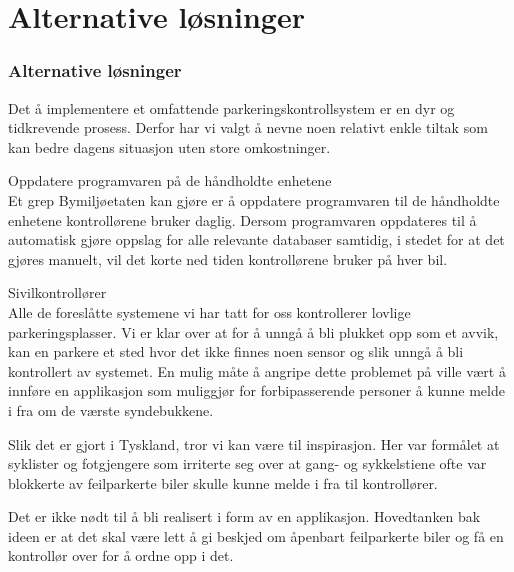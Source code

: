 \documentclass[xetex]{beamer}
\begin{document}
\begin{frame}\label{fr:alternative_losninger}
	\section{Alternative løsninger}
	\frametitle{Alternative løsninger}
	
	Det å implementere et omfattende parkeringskontrollsystem er en \alert{dyr og tidkrevende} prosess. Derfor har vi valgt å nevne noen relativt enkle tiltak som kan bedre dagens situasjon uten store omkostninger.
	
	{\footnotesize\alert{Oppdatere programvaren på de håndholdte enhetene}}\\
	Et grep Bymiljøetaten kan gjøre er å \alert{oppdatere programvaren til de håndholdte enhetene} kontrollørene bruker daglig. Dersom programvaren oppdateres til å \alert{automatisk} gjøre oppslag for alle relevante databaser samtidig, i stedet for at det gjøres manuelt, vil det korte ned tiden kontrollørene bruker på hver bil.
	
	{\footnotesize\alert{Sivilkontrollører}}\\
	Alle de foreslåtte systemene vi har tatt for oss kontrollerer lovlige parkeringsplasser. Vi er klar over at for å unngå å bli plukket opp som et avvik, kan en parkere et sted hvor det ikke finnes noen sensor og slik unngå å bli kontrollert av systemet. En mulig måte å angripe dette problemet på ville vært å innføre en applikasjon som muliggjør for forbipasserende personer å kunne melde i fra om de værste syndebukkene. 

	Slik det er gjort i \alert{Tyskland}, tror vi kan være til inspirasjon. Her var formålet at syklister og fotgjengere som irriterte seg over at gang- og sykkelstiene ofte var blokkerte av feilparkerte biler skulle kunne melde i fra til kontrollører. 

	Det er ikke nødt til å bli realisert i form av en applikasjon. Hovedtanken bak ideen er at det skal være \alert{lett å gi beskjed om åpenbart feilparkerte biler} og få en kontrollør over for å ordne opp i det. 
\end{frame}
\end{document}
